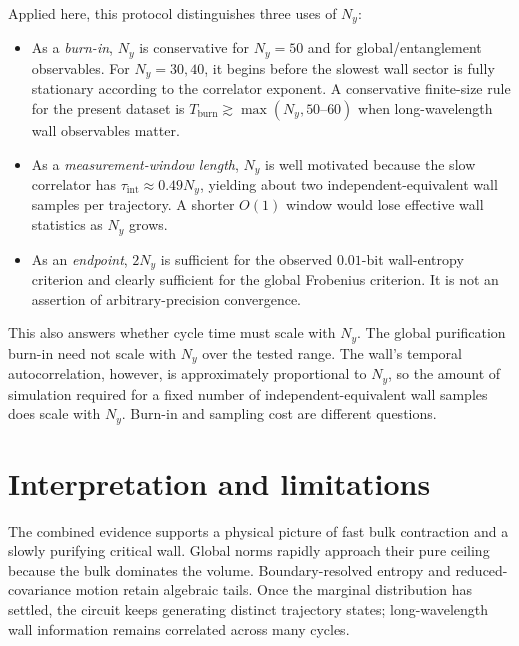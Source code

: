 \documentclass[aps,prb,twocolumn,nofootinbib,superscriptaddress,floatfix]{revtex4-2}
\newcommand{\Tint}{\tau_{\mathrm{int}}}
\begin{document}
Applied here, this protocol distinguishes three uses of $N_y$:
\begin{itemize}
  \item As a \emph{burn-in}, $N_y$ is conservative for $N_y=50$ and for
  global/entanglement observables.  For $N_y=30,40$, it begins before the
  slowest wall sector is fully stationary according to the correlator exponent.
  A conservative finite-size rule for the present dataset is
  $T_{\mathrm{burn}}\gtrsim\max(N_y,50\text{--}60)$ when long-wavelength wall
  observables matter.
  \item As a \emph{measurement-window length}, $N_y$ is well motivated because
  the slow correlator has $\Tint\approx0.49N_y$, yielding about two
  independent-equivalent wall samples per trajectory.  A shorter $O(1)$ window
  would lose effective wall statistics as $N_y$ grows.
  \item As an \emph{endpoint}, $2N_y$ is sufficient for the observed
  $0.01$-bit wall-entropy criterion and clearly sufficient for the global
  Frobenius criterion.  It is not an assertion of arbitrary-precision
  convergence.
\end{itemize}

This also answers whether cycle time must scale with $N_y$.  The global
purification burn-in need not scale with $N_y$ over the tested range.  The
wall's temporal autocorrelation, however, is approximately proportional to
$N_y$, so the amount of simulation required for a fixed number of
independent-equivalent wall samples does scale with $N_y$.  Burn-in and sampling
cost are different questions.

\section{Interpretation and limitations}
\label{sec:limitations}

The combined evidence supports a physical picture of fast bulk contraction and
a slowly purifying critical wall.  Global norms rapidly approach their pure
ceiling because the bulk dominates the volume.  Boundary-resolved entropy and
reduced-covariance motion retain algebraic tails.  Once the marginal
distribution has settled, the circuit keeps generating distinct trajectory
states; long-wavelength wall information remains correlated across many cycles.
\end{document}
